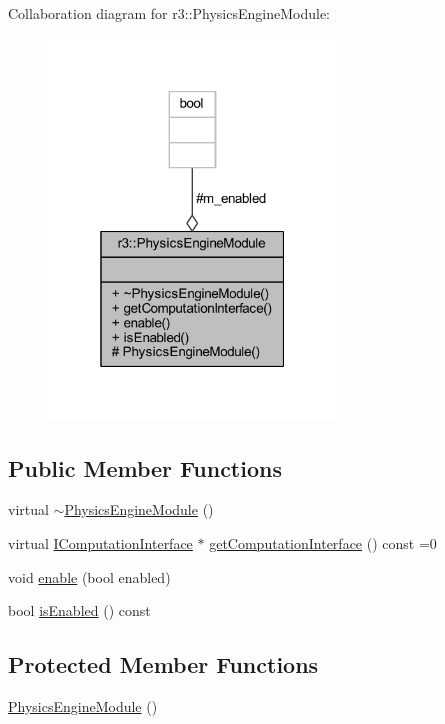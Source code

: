 Collaboration diagram for r3\+:\+:Physics\+Engine\+Module\+:\nopagebreak
\begin{figure}[H]
\begin{center}
\leavevmode
\includegraphics[width=217pt]{classr3_1_1_physics_engine_module__coll__graph}
\end{center}
\end{figure}
\subsection*{Public Member Functions}
\begin{DoxyCompactItemize}
\item 
virtual \mbox{\hyperlink{classr3_1_1_physics_engine_module_af2b491daa564a15ec5362780c885e2ca}{$\sim$\+Physics\+Engine\+Module}} ()
\item 
virtual \mbox{\hyperlink{classr3_1_1_i_computation_interface}{I\+Computation\+Interface}} $\ast$ \mbox{\hyperlink{classr3_1_1_physics_engine_module_a3b1d0d9bea0a82534f367f6d728312d3}{get\+Computation\+Interface}} () const =0
\item 
void \mbox{\hyperlink{classr3_1_1_physics_engine_module_abaaace8d25ea23ed21ade61ca2b201d0}{enable}} (bool enabled)
\item 
bool \mbox{\hyperlink{classr3_1_1_physics_engine_module_add8b93ca3e3e3ec0ff045c15610119ea}{is\+Enabled}} () const
\end{DoxyCompactItemize}
\subsection*{Protected Member Functions}
\begin{DoxyCompactItemize}
\item 
\mbox{\hyperlink{classr3_1_1_physics_engine_module_a37f69469023611b549a09c2afc23df20}{Physics\+Engine\+Module}} ()
\end{DoxyCompactItemize}
